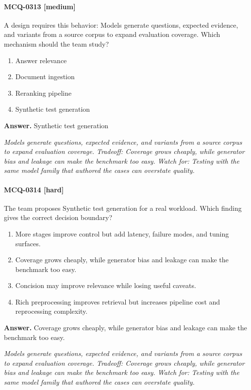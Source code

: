 \paragraph{MCQ-0313 [medium]} A design requires this behavior: Models generate questions, expected evidence, and variants from a source corpus to expand evaluation coverage. Which mechanism should the team study?
\begin{enumerate}[label=\Alph*.]
\item Answer relevance
\item Document ingestion
\item Reranking pipeline
\item Synthetic test generation
\end{enumerate}
\noindent\textbf{Answer.} Synthetic test generation
\par\textit{Models generate questions, expected evidence, and variants from a source corpus to expand evaluation coverage. Tradeoff: Coverage grows cheaply, while generator bias and leakage can make the benchmark too easy. Watch for: Testing with the same model family that authored the cases can overstate quality.}
\paragraph{MCQ-0314 [hard]} The team proposes Synthetic test generation for a real workload. Which finding gives the correct decision boundary?
\begin{enumerate}[label=\Alph*.]
\item More stages improve control but add latency, failure modes, and tuning surfaces.
\item Coverage grows cheaply, while generator bias and leakage can make the benchmark too easy.
\item Concision may improve relevance while losing useful caveats.
\item Rich preprocessing improves retrieval but increases pipeline cost and reprocessing complexity.
\end{enumerate}
\noindent\textbf{Answer.} Coverage grows cheaply, while generator bias and leakage can make the benchmark too easy.
\par\textit{Models generate questions, expected evidence, and variants from a source corpus to expand evaluation coverage. Tradeoff: Coverage grows cheaply, while generator bias and leakage can make the benchmark too easy. Watch for: Testing with the same model family that authored the cases can overstate quality.}
